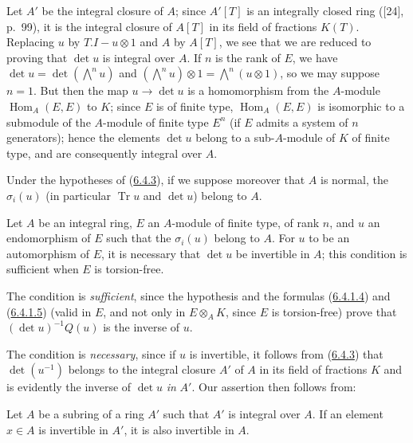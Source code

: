 Let $A'$ be the integral closure of $A$; since $A'[T]$ is an integrally
closed ring ([24], p.~99), it is the integral closure of $A[T]$ in its field
of fractions $K(T)$. Replacing $u$ by $T.I-u\otimes1$ and $A$ by $A[T]$,
we see that we are reduced to proving that $\det u$ is integral over $A$. If
$n$ is the rank of $E$, we have $\det u=\det(\bigwedge^n u)$ and
$(\bigwedge^n u)\otimes1=\bigwedge^n(u\otimes1)$, so we may suppose
$n=1$. But then the map $u\to\det u$ is a homomorphism from the
$A$-module $\operatorname{Hom}_A(E,E)$ to $K$; since $E$ is of finite type,
$\operatorname{Hom}_A(E,E)$ is isomorphic to a submodule of the $A$-module of
finite type $E^n$ (if $E$ admits a system of $n$ generators); hence the
elements $\det u$ belong to a sub-$A$-module of $K$ of finite type, and are
consequently integral over $A$.


\begin{corollary}[6.4.4]
\label{II.6.4.4}
Under the hypotheses of \textup{(\hyperref[II.6.4.3]{6.4.3})}, if we suppose
moreover that $A$ is normal, the $\sigma_i(u)$ (in particular
$\operatorname{Tr}u$ and $\det u$) belong to $A$.
\end{corollary}

\begin{proposition}[6.4.5]
\label{II.6.4.5}
Let $A$ be an integral ring, $E$ an $A$-module of finite type, of rank $n$,
and $u$ an endomorphism of $E$ such that the $\sigma_i(u)$ belong to $A$. For
$u$ to be an automorphism of $E$, it is necessary that $\det u$ be
invertible in $A$; this condition is sufficient when $E$ is torsion-free.
\end{proposition}

The condition is \emph{sufficient}, since the hypothesis and the formulas
(\hyperref[II.6.4.1.4]{6.4.1.4}) and
(\hyperref[II.6.4.1.5]{6.4.1.5}) (valid in $E$, and not only in
$E\otimes_AK$, since $E$ is torsion-free) prove that
$(\det u)^{-1}Q(u)$ is the inverse of $u$.

The condition is \emph{necessary}, since if $u$ is invertible, it follows
from (\hyperref[II.6.4.3]{6.4.3}) that $\det(u^{-1})$ belongs to the
integral closure $A'$ of $A$ in its field of fractions $K$ and is evidently
the inverse of $\det u$ \emph{in} $A'$. Our assertion then follows from:

\begin{lemma}[6.4.5.1]
\label{II.6.4.5.1}
Let $A$ be a subring of a ring $A'$ such that $A'$ is \textup{integral} over $A$. If
an element $x\in A$ is invertible in $A'$, it is also invertible in $A$.
\end{lemma}

